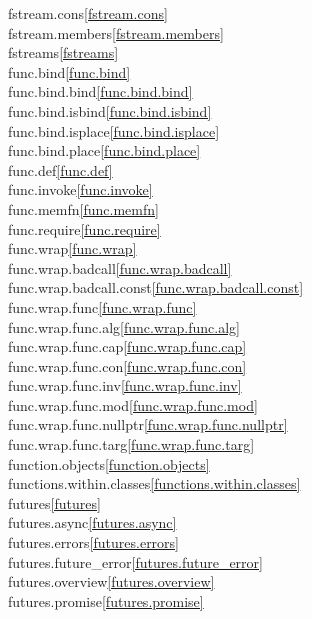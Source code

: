 \begin{multicols}{2}
fstream.cons\quad\ref{fstream.cons}\\
fstream.members\quad\ref{fstream.members}\\
fstreams\quad\ref{fstreams}\\
func.bind\quad\ref{func.bind}\\
func.bind.bind\quad\ref{func.bind.bind}\\
func.bind.isbind\quad\ref{func.bind.isbind}\\
func.bind.isplace\quad\ref{func.bind.isplace}\\
func.bind.place\quad\ref{func.bind.place}\\
func.def\quad\ref{func.def}\\
func.invoke\quad\ref{func.invoke}\\
func.memfn\quad\ref{func.memfn}\\
func.require\quad\ref{func.require}\\
func.wrap\quad\ref{func.wrap}\\
func.wrap.badcall\quad\ref{func.wrap.badcall}\\
func.wrap.badcall.const\quad\ref{func.wrap.badcall.const}\\
func.wrap.func\quad\ref{func.wrap.func}\\
func.wrap.func.alg\quad\ref{func.wrap.func.alg}\\
func.wrap.func.cap\quad\ref{func.wrap.func.cap}\\
func.wrap.func.con\quad\ref{func.wrap.func.con}\\
func.wrap.func.inv\quad\ref{func.wrap.func.inv}\\
func.wrap.func.mod\quad\ref{func.wrap.func.mod}\\
func.wrap.func.nullptr\quad\ref{func.wrap.func.nullptr}\\
func.wrap.func.targ\quad\ref{func.wrap.func.targ}\\
function.objects\quad\ref{function.objects}\\
functions.within.classes\quad\ref{functions.within.classes}\\
futures\quad\ref{futures}\\
futures.async\quad\ref{futures.async}\\
futures.errors\quad\ref{futures.errors}\\
futures.future_error\quad\ref{futures.future_error}\\
futures.overview\quad\ref{futures.overview}\\
futures.promise\quad\ref{futures.promise}\\

\end{multicols}
